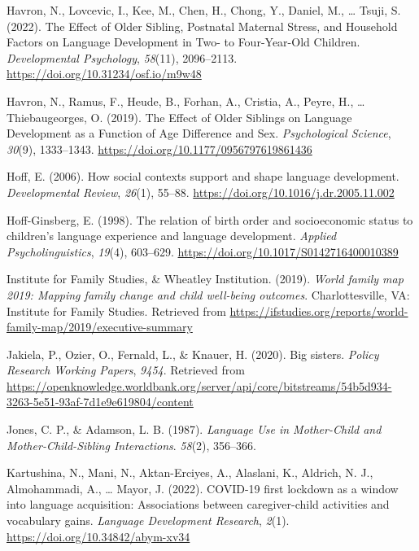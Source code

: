 \documentclass[
  man,mask,floatsintext]{apa6}
\newlength{\cslhangindent}
\newlength{\cslentryspacingunit} %
\newenvironment{CSLReferences}[2] %
 {%
  \setlength{\parindent}{0pt}
  \ifodd #1
  \let\oldpar\par
  \def\par{\hangindent=\cslhangindent\oldpar}
  \fi
  \setlength{\parskip}{#2\cslentryspacingunit}
 }%
 {}
\begin{document}
\begin{CSLReferences}{1}{0}
\leavevmode{}%
Havron, N., Lovcevic, I., Kee, M., Chen, H., Chong, Y., Daniel, M., \ldots{} Tsuji, S. (2022). The {Effect} of {Older} {Sibling}, {Postnatal} {Maternal} {Stress}, and {Household} {Factors} on {Language} {Development} in {Two}- to {Four}-{Year}-{Old} {Children}. \emph{Developmental Psychology}, \emph{58}(11), 2096--2113. \url{https://doi.org/10.31234/osf.io/m9w48}

\leavevmode{}%
Havron, N., Ramus, F., Heude, B., Forhan, A., Cristia, A., Peyre, H., \ldots{} Thiebaugeorges, O. (2019). The {Effect} of {Older} {Siblings} on {Language} {Development} as a {Function} of {Age} {Difference} and {Sex}. \emph{Psychological Science}, \emph{30}(9), 1333--1343. \url{https://doi.org/10.1177/0956797619861436}

\leavevmode{}%
Hoff, E. (2006). How social contexts support and shape language development. \emph{Developmental Review}, \emph{26}(1), 55--88. \url{https://doi.org/10.1016/j.dr.2005.11.002}

\leavevmode{}%
Hoff-Ginsberg, E. (1998). The relation of birth order and socioeconomic status to children's language experience and language development. \emph{Applied Psycholinguistics}, \emph{19}(4), 603--629. \url{https://doi.org/10.1017/S0142716400010389}

\leavevmode{}%
Institute for Family Studies, \& Wheatley Institution. (2019). \emph{World family map 2019: {Mapping} family change and child well-being outcomes}. Charlottesville, VA: Institute for Family Studies. Retrieved from \url{https://ifstudies.org/reports/world-family-map/2019/executive-summary}

\leavevmode{}%
Jakiela, P., Ozier, O., Fernald, L., \& Knauer, H. (2020). Big sisters. \emph{Policy Research Working Papers}, \emph{9454}. Retrieved from \url{https://openknowledge.worldbank.org/server/api/core/bitstreams/54b5d934-3263-5e51-93af-7d1e9e619804/content}

\leavevmode{}%
Jones, C. P., \& Adamson, L. B. (1987). \emph{Language {Use} in {Mother}-{Child} and {Mother}-{Child}-{Sibling} {Interactions}}. \emph{58}(2), 356--366.

\leavevmode{}%
Kartushina, N., Mani, N., Aktan-Erciyes, A., Alaslani, K., Aldrich, N. J., Almohammadi, A., \ldots{} Mayor, J. (2022). {COVID}-19 first lockdown as a window into language acquisition: Associations between caregiver-child activities and vocabulary gains. \emph{Language Development Research}, \emph{2}(1). \url{https://doi.org/10.34842/abym-xv34}


\end{CSLReferences}
\end{document}
